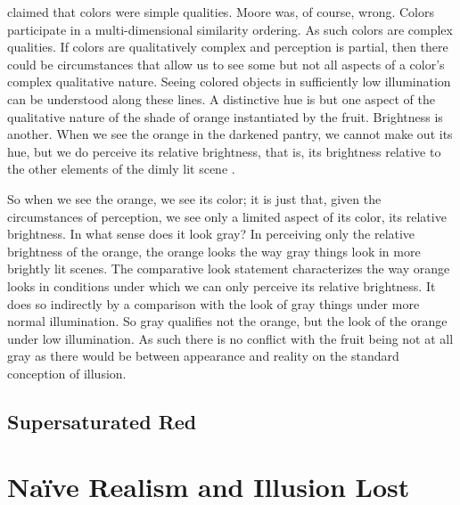 \documentclass[12pt]{article}
\begin{document}
\citet{Moore:1903lr} claimed that colors were simple qualities. Moore was, of course, wrong. Colors participate in a multi-dimensional similarity ordering. As such colors are complex qualities. If colors are qualitatively complex and perception is partial, then there could be circumstances that allow us to see some but not all aspects of a color's complex qualitative nature. Seeing colored objects in sufficiently low illumination can be understood along these lines. A distinctive hue is but one aspect of the qualitative nature of the shade of orange instantiated by the fruit. Brightness is another. When we see the orange in the darkened pantry, we cannot make out its hue, but we do perceive its relative brightness, that is, its brightness relative to the other elements of the dimly lit scene \citep[see][]{Arthadeva:1961vn}.

So when we see the orange, we see its color; it is just that, given the circumstances of perception, we see only a limited aspect of its color, its relative brightness. In what sense does it look gray? In perceiving only the relative brightness of the orange, the orange looks the way gray things look in more brightly lit scenes. The comparative look statement characterizes the way orange looks in conditions under which we can only perceive its relative brightness. It does so indirectly by a comparison with the look of gray things under more normal illumination. So gray qualifies not the orange, but the look of the orange under low illumination. As such there is no conflict with the fruit being not at all gray as there would be between appearance and reality on the standard conception of illusion. 



\subsection{Supersaturated Red}\label{sub:supersaturated_red} %




\section{Naïve Realism and Illusion Lost}\label{sec:naïve_realism_and_illusion_lost} %



 
 
\end{document}
